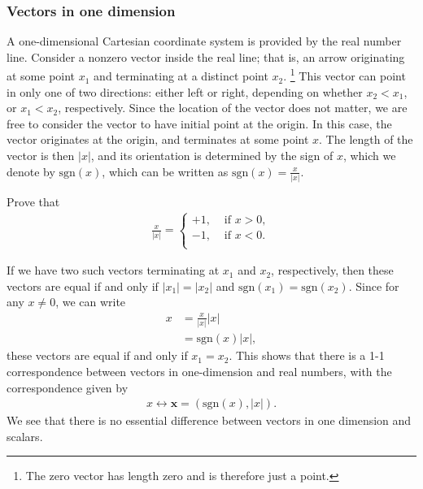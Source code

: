 \documentclass[12pt,letterpaper,reqno]{article}
\numberwithin{equation}{section}
\newcommand{\sgn}{\text{sgn}}
\begin{document}
\subsubsection{Vectors in one dimension}
A one-dimensional Cartesian coordinate system is provided by the real number line. Consider a nonzero vector inside the real line; that is, an arrow originating at some point $x_1$ and terminating at a distinct point $x_2$. \footnote{The zero vector has length zero and is therefore just a point.} This vector can point in only one of two directions: either left or right, depending on whether $x_2<x_1$, or $x_1<x_2$, respectively.  Since the location of the vector does not matter, we are free to consider the vector to have initial point at the origin. In this case, the vector originates at the origin, and terminates at some point $x$. The length of the vector is then $|x|$, and its orientation is determined by the sign of $x$, which we denote by $\sgn(x)$, which can be written as $\sgn(x)=\frac{x}{|x|}$. 
\begin{exercise}
	Prove that 
\begin{align*}
	\frac{x}{|x|}=\begin{cases}
		+1, &\text{ if } x>0, \\
		-1, &\text{ if } x<0. \\
	\end{cases}
\end{align*}
\end{exercise}

If we have two such vectors terminating at $x_1$ and $x_2$, respectively, then these vectors are equal if and only if $|x_1|=|x_2|$ and $\sgn(x_1)=\sgn(x_2)$. Since for any $x \neq 0$, we can write
\begin{align*}
	x&=\frac{x}{|x|}|x|\\
	&=\sgn(x)|x|,
\end{align*} 
these vectors are equal if and only if $x_1=x_2$. This shows that there is a 1-1 correspondence between vectors in one-dimension and real numbers, with the correspondence given by
\begin{align*}
	x \leftrightarrow \mathbf{x}=(\sgn(x),|x|).
\end{align*}
We see that there is no essential difference between vectors in one dimension and scalars.
\end{document}
